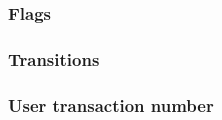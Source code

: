 \subsubsection{Flags}                   \label{user txn data: generalities: perspectives: flags}                        
\subsubsection{Transitions}             \label{user txn data: generalities: perspectives: transitions}                  
\subsubsection{User transaction number} \label{user txn data: generalities: perspectives: user transaction number}      
